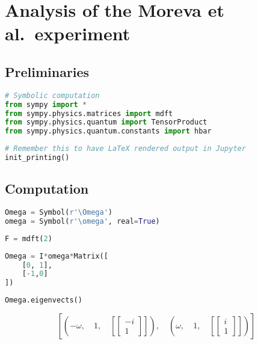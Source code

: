 \hypertarget{nb:moreva}{%
\section{Analysis of the Moreva et
al.~experiment}\label{nb:jupyter:moreva}}

\hypertarget{nb:jupyter:moreva:preliminaries}{%
\subsection{Preliminaries}\label{nb:jupyter:moreva:preliminaries}}

\begin{lstlisting}[language=Python]
# Symbolic computation
from sympy import *
from sympy.physics.matrices import mdft
from sympy.physics.quantum import TensorProduct
from sympy.physics.quantum.constants import hbar
\end{lstlisting}

\begin{lstlisting}[language=Python]
# Remember this to have LaTeX rendered output in Jupyter
init_printing()
\end{lstlisting}

\hypertarget{nb:jupyter:moreva:computation}{%
\subsection{Computation}\label{nb:jupyter:moreva:computation}}

\begin{lstlisting}[language=Python]
Omega = Symbol(r'\Omega')
omega = Symbol(r'\omega', real=True)
\end{lstlisting}

\begin{lstlisting}[language=Python]
F = mdft(2)
\end{lstlisting}

\begin{lstlisting}[language=Python]
Omega = I*omega*Matrix([
    [0, 1],
    [-1,0]
])
\end{lstlisting}

\begin{lstlisting}[language=Python]
Omega.eigenvects()
\end{lstlisting}

\[\left [ \left ( - \omega, \quad 1, \quad \left [ \left[\begin{matrix}- i\\1\end{matrix}\right]\right ]\right ), \quad \left ( \omega, \quad 1, \quad \left [ \left[\begin{matrix}i\\1\end{matrix}\right]\right ]\right )\right ]\]

